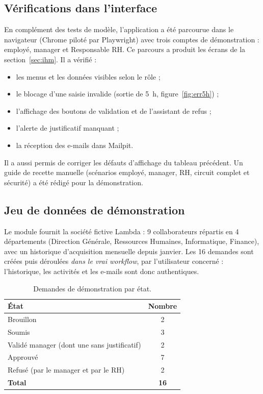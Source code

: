 \documentclass[11pt,a4paper]{article}
\begin{document}
\subsection{Vérifications dans l'interface}
En complément des tests de modèle, l'application a été parcourue dans le navigateur (Chrome
piloté par Playwright) avec trois comptes de démonstration : employé, manager et Responsable RH.
Ce parcours a produit les écrans de la section~\ref{sec:ihm}. Il a vérifié :
\begin{itemize}
  \item les menus et les données visibles selon le rôle ;
  \item le blocage d'une saisie invalide (sortie de 5~h, figure~\ref{fig:err5h}) ;
  \item l'affichage des boutons de validation et de l'assistant de refus ;
  \item l'alerte de justificatif manquant ;
  \item la réception des e-mails dans Mailpit.
\end{itemize}
Il a aussi permis de corriger les défauts d'affichage du tableau précédent. Un guide de recette
manuelle (scénarios employé, manager, RH, circuit complet et sécurité) a été rédigé pour la
démonstration.

\subsection{Jeu de données de démonstration}\label{sec:demo}
Le module fournit la société fictive \og Lambda \fg{} : 9 collaborateurs répartis en 4
départements (Direction Générale, Ressources Humaines, Informatique, Finance), avec un historique
d'acquisition mensuelle depuis janvier. Les 16 demandes sont créées puis déroulées \emph{dans le
vrai workflow}, par l'utilisateur concerné : l'historique, les activités et les e-mails sont donc
authentiques.

\begin{table}[H]
\centering
\caption{Demandes de démonstration par état.}
\small
\begin{tabular}{l c}
\toprule
État & Nombre \\
\midrule
Brouillon & 2 \\
Soumis & 3 \\
Validé manager (dont une sans justificatif) & 2 \\
Approuvé & 7 \\
Refusé (par le manager et par le RH) & 2 \\
\midrule
\textbf{Total} & \textbf{16} \\
\bottomrule
\end{tabular}
\end{table}
\end{document}
